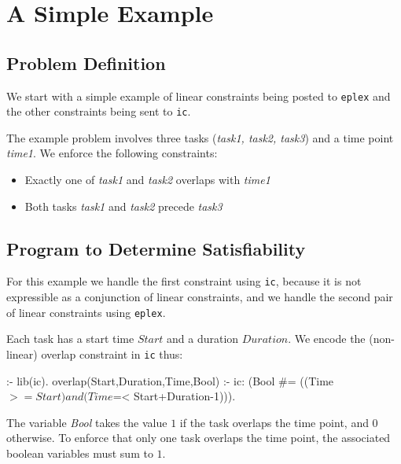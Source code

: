 
\section{A Simple Example}

\subsection{Problem Definition}
We start with a simple example of linear constraints being posted to
{\tt eplex} and the other constraints being sent to {\tt ic}.

The example problem involves three tasks ({\em task1, task2, task3})
and a time point 
{\em time1}.  We enforce the following constraints:
\begin{itemize}
\item Exactly one of {\em task1} and {\em task2} overlaps with {\em
time1}
\item Both tasks {\em task1} and {\em task2} precede {\em task3}
\end{itemize}

\subsection{Program to Determine Satisfiability}
For this example we handle the first constraint using {\tt ic},
because it is not expressible as a conjunction of linear constraints,
and we handle the second pair of linear constraints using {\tt eplex}.

 
Each task has a start time $Start$ and a duration $Duration$.  
We encode the (non-linear) overlap constraint in {\tt ic} thus:
\begin{code}
:- lib(ic).
overlap(Start,Duration,Time,Bool) :-
       ic: (Bool #= ((Time $>= Start) and (Time $=< Start+Duration-1))).
\end{code}
The variable {\em Bool} takes the value $1$ if the task overlaps the
time point, and $0$ otherwise.  To enforce that only one task overlaps
the time point, the associated boolean variables must sum to $1$.


